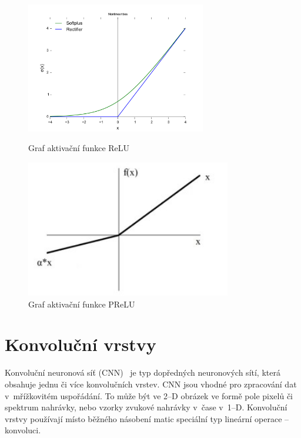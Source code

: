 \begin{figure}[H]
    \centering
    \begin{minipage}{0.45\textwidth}
        \centering
        \includegraphics[width=0.7\textwidth]{obrazky-figures/ReLU.png}
        \caption{\label{fig:relu}Graf aktivační funkce ReLU}
    \end{minipage}\hfill
    \begin{minipage}{0.45\textwidth}
        \centering
        \includegraphics[width=0.8\textwidth]{obrazky-figures/prelu.jpg}
        \caption{\label{fig:prelu}Graf aktivační funkce PReLU}
    \end{minipage}
\end{figure}


\section{Konvoluční vrstvy}
Konvoluční neuronová síť (CNN)~\cite{6795724} je typ dopředných neuronových sítí, která obsahuje jednu či více konvolučních vrstev. CNN jsou vhodné pro zpracování dat v~mřížkovitém uspořádání. To může být ve 2--D obrázek ve formě pole pixelů či spektrum nahrávky, nebo vzorky zvukové nahrávky v~čase v~1--D. Konvoluční vrstvy používají místo běžného násobení matic speciální typ lineární operace -- konvoluci.

